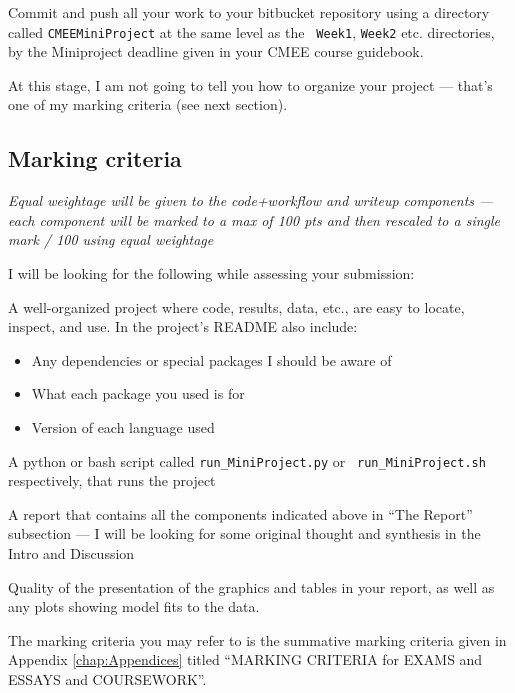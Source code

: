 Commit and push all your work to your bitbucket repository using a 
directory called {\tt CMEEMiniProject} at the same level as the {\tt 
Week1}, {\tt Week2} etc. directories, by the Miniproject deadline given 
in your CMEE course guidebook.

At this stage, I am not going to tell you how to organize your project 
--- that's one of my marking criteria (see next section). 

\subsection {Marking criteria}

{\it Equal weightage will be given to the code+workflow and writeup 
components --- each component will be marked to a max of 100 pts and 
then rescaled to a single mark / 100 using equal weightage}
 
I will be looking for the following while assessing your submission:

\begin{compactitem}

	\item A well-organized project where code, results, data, etc., are 
	easy to locate, inspect, and use. In the project's README also 
	include: 
	\begin{itemize}
	\item Any dependencies or special packages I should be aware of  	
	\item What each package you used is for
	\item Version of each language used
	\end{itemize}

	\item A python or bash script called {\tt run\_MiniProject.py} or {\tt 
	run\_MiniProject.sh} respectively, that runs the project

	\item A report that contains all the components indicated above in 
	``The Report'' subsection --- I will be looking for some original 
	thought and synthesis in the Intro and Discussion

	\item Quality of the presentation of the graphics and tables in your 
	report, as well as any plots showing model fits to the data.  

\end{compactitem}

The marking criteria you may refer to is the summative marking criteria 
given in Appendix \ref{chap:Appendices} titled ``MARKING CRITERIA for 
EXAMS and ESSAYS and COURSEWORK''.  

